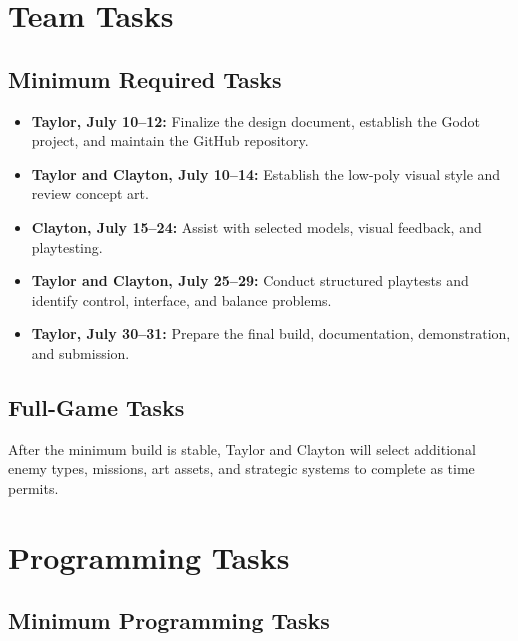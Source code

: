 \documentclass[journal]{IEEEtran}
\begin{document}
\section{Team Tasks}

\subsection{Minimum Required Tasks}

\begin{itemize}

    \item \textbf{Taylor, July 10--12:}
    Finalize the design document, establish the Godot project, and maintain the GitHub repository.

    \item \textbf{Taylor and Clayton, July 10--14:}
    Establish the low-poly visual style and review concept art.

    \item \textbf{Clayton, July 15--24:}
    Assist with selected models, visual feedback, and playtesting.

    \item \textbf{Taylor and Clayton, July 25--29:}
    Conduct structured playtests and identify control, interface, and balance problems.

    \item \textbf{Taylor, July 30--31:}
    Prepare the final build, documentation, demonstration, and submission.

\end{itemize}


\subsection{Full-Game Tasks}

After the minimum build is stable, Taylor and Clayton will select additional enemy types, missions, art assets, and strategic systems to complete as time permits.


\section{Programming Tasks}

\subsection{Minimum Programming Tasks}
\end{document}
